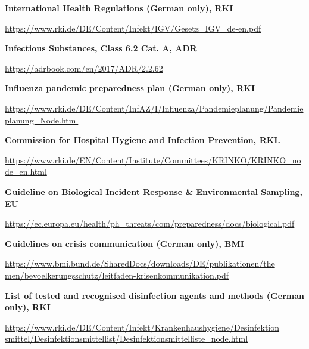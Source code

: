 \documentclass{article}
\begin{document}
\textbf{International Health Regulations (German only), RKI }


\href{https://www.rki.de/DE/Content/Infekt/IGV/Gesetz_IGV_de-en.pdf}{https://www.rki.de/DE/Content/Infekt/IGV/Gesetz\_IGV\_de-en.pdf}


\textbf{Infectious Substances, Class 6.2 Cat. A, ADR} 


\href{https://adrbook.com/en/2017/ADR/2.2.62}{https://adrbook.com/en/2017/ADR/2.2.62} 


\textbf{Influenza pandemic preparedness plan (German only), RKI}


\href{https://www.rki.de/DE/Content/InfAZ/I/Influenza/Pandemieplanung/Pandemieplanung_Node.html}{https://www.rki.de/DE/Content/InfAZ/I/Influenza/Pandemieplanung/Pandemieplanung\_Node.html}


\textbf{Commission for Hospital Hygiene and Infection Prevention, RKI.}


\href{https://www.rki.de/EN/Content/Institute/Committees/KRINKO/KRINKO_node_en.html}{https://www.rki.de/EN/Content/Institute/Committees/KRINKO/KRINKO\_node\_en.html}


\textbf{Guideline on Biological Incident Response \& Environmental Sampling, EU}


\href{https://ec.europa.eu/health/ph_threats/com/preparedness/docs/biological.pdf}{https://ec.europa.eu/health/ph\_threats/com/preparedness/docs/biological.pdf}


\textbf{Guidelines on crisis communication (German only), BMI}


\href{https://www.bmi.bund.de/SharedDocs/downloads/DE/publikationen/themen/bevoelkerungsschutz/leitfaden-krisenkommunikation.pdf}{https://www.bmi.bund.de/SharedDocs/downloads/DE/publikationen/the} \href{https://www.bmi.bund.de/SharedDocs/downloads/DE/publikationen/themen/bevoelkerungsschutz/leitfaden-krisenkommunikation.pdf}{men/bevoelkerungsschutz/leitfaden-krisenkommunikation.pdf}


\textbf{List of tested and recognised disinfection agents and methods (German only), RKI}


\href{https://www.rki.de/DE/Content/Infekt/Krankenhaushygiene/Desinfektionsmittel/Desinfektionsmittellist/Desinfektionsmittelliste_node.html}{https://www.rki.de/DE/Content/Infekt/Krankenhaushygiene/Desinfektion} \href{https://www.rki.de/DE/Content/Infekt/Krankenhaushygiene/Desinfektionsmittel/Desinfektionsmittellist/Desinfektionsmittelliste_node.html}{smittel/Desinfektionsmittellist/Desinfektionsmittelliste\_node.html}
\end{document}
